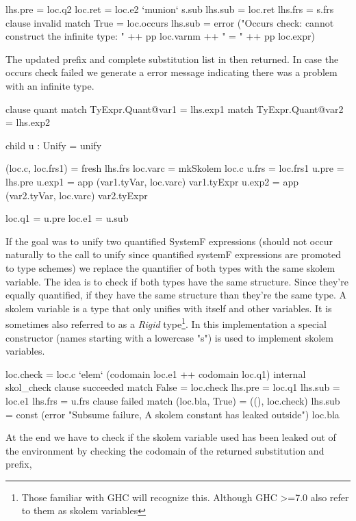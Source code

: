 \begin{code}
                               lhs.pre = loc.q2
                               loc.ret = loc.e2 `munion` s.sub
                               lhs.sub = loc.ret
                               lhs.frs = s.frs  
                             clause invalid
                               match True = loc.occurs
                               lhs.sub = error ("Occurs check: cannot construct the infinite type: " ++ pp loc.varnm ++ " = " ++ pp loc.expr)
\end{code}
The updated prefix and complete substitution list in then returned. In case the occurs check failed we generate a error message indicating there was a problem with an infinite type.

\begin{code}
                     clause quant
                       match TyExpr.Quant@var1 = lhs.exp1
                       match TyExpr.Quant@var2 = lhs.exp2
                       
                       child u : Unify = unify
                       
                       (loc.c, loc.frs1) = fresh lhs.frs
                       loc.varc = mkSkolem loc.c
                       u.frs  = loc.frs1
                       u.pre  = lhs.pre
                       u.exp1 = app (var1.tyVar, loc.varc) var1.tyExpr
                       u.exp2 = app (var2.tyVar, loc.varc) var2.tyExpr
                       
                       loc.q1 = u.pre
                       loc.e1 = u.sub
\end{code}
If the goal was to unify two quantified SystemF expressions (should not occur naturally to the call to unify since quantified systemF expressions are promoted to type schemes) we replace the quantifier of both types with the same skolem variable. The idea is to check if both types have the same structure. Since they're equally quantified, if they have the same structure than they're the same type.
A skolem variable is a type that only unifies with itself and other variables. It is sometimes also referred to as a \emph{Rigid} type\footnote{Those familiar with GHC will recognize this. Although GHC >=7.0 also refer to them as skolem variables}. In this implementation a special constructor (names starting with a lowercase "s") is used to implement skolem variables.
\begin{code}                       
                       loc.check = loc.c `elem` (codomain loc.e1 ++ codomain loc.q1)
                       internal skol_check
                          clause succeeded
                            match False  = loc.check
                            lhs.pre = loc.q1
                            lhs.sub = loc.e1
                            lhs.frs = u.frs
                          clause failed
                            match (loc.bla, True) = ((), loc.check)
                            lhs.sub = const (error "Subsume failure, A skolem constant has leaked outside") loc.bla
\end{code}
At the end we have to check if the skolem variable used has been leaked out of the environment by checking the codomain of the returned substitution and prefix,

